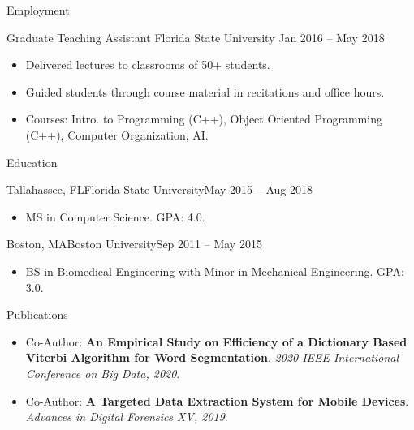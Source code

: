 \documentclass[]{mcdowellcv}
\begin{document}
\begin{cvsection}{Employment}
		\begin{cvsubsection} {Graduate Teaching Assistant} {Florida State University} {Jan 2016 -- May 2018}
			\begin{itemize}
				\item Delivered lectures to classrooms of 50+ students.
				\item Guided students through course material in recitations and office hours.
				\item Courses: Intro. to Programming (C++), Object Oriented Programming (C++), Computer Organization, AI.
			\end{itemize}
		\end{cvsubsection}
	\end{cvsection}
	
	\begin{cvsection}{Education}
		\begin{cvsubsection}{Tallahassee, FL}{Florida State University}{May 2015 -- Aug 2018}
			\begin{itemize}
				\item MS in Computer Science. GPA: 4.0.
			\end{itemize}
		\end{cvsubsection}
		
		\begin{cvsubsection}{Boston, MA}{Boston University}{Sep 2011 -- May 2015}
			\begin{itemize}
				\item BS in Biomedical Engineering with Minor in Mechanical Engineering. GPA: 3.0.
			\end{itemize}
		\end{cvsubsection}
	\end{cvsection}

	\begin{cvsection}{Publications}
		\begin{cvsubsection}{}{}{}	
			\begin{itemize}
				\item Co-Author: \textbf{An Empirical Study on Efficiency of a Dictionary Based Viterbi Algorithm for Word Segmentation}. \textit{2020 IEEE International Conference on Big Data, 2020}.
				\item Co-Author: \textbf{A Targeted Data Extraction System for Mobile Devices}. \textit{Advances in Digital Forensics XV, 2019}.
			\end{itemize}
		\end{cvsubsection}
	\end{cvsection}
	
\end{document}
